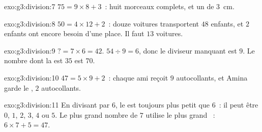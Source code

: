 \begin{solution}{exo:g3:division:7}
$75 = 9 \times 8 + 3$~: huit morceaux complets, et un  de
$3$~cm.
\end{solution}

\begin{solution}{exo:g3:division:8}
$50 = 4 \times 12 + 2$~: douze voitures transportent $48$ enfants, et
$2$ enfants ont encore besoin d'une place. Il faut $13$ voitures.
\end{solution}

\begin{solution}{exo:g3:division:9}
$? = 7 \times 6 = 42$. \quad
$54 \div 9 = 6$, donc le diviseur manquant est $9$. \quad
Le nombre dont la  est $35$ est $70$.
\end{solution}

\begin{solution}{exo:g3:division:10}
$47 = 5 \times 9 + 2$~: chaque ami reçoit $9$ autocollants, et
Amina garde le , $2$ autocollants.
\end{solution}

\begin{solution}{exo:g3:division:11}
En divisant par $6$, le  est toujours plus petit que $6$~: il
peut être $0$, $1$, $2$, $3$, $4$ ou $5$. Le plus grand nombre de
 $7$ utilise le plus grand ~: $6 \times 7 + 5 = 47$.
\end{solution}
